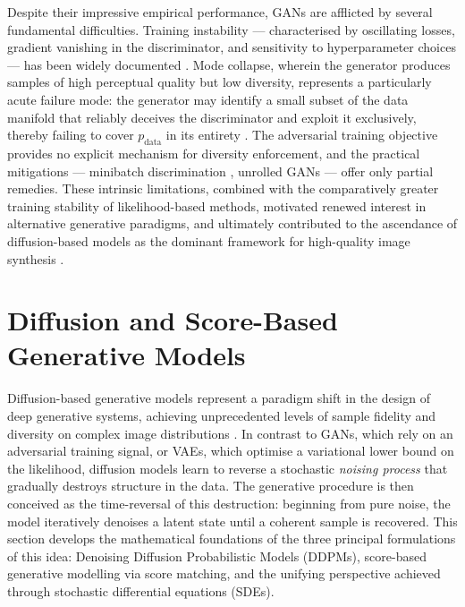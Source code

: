 Despite their impressive empirical performance, GANs are afflicted by several
fundamental difficulties. Training instability — characterised by oscillating
losses, gradient vanishing in the discriminator, and sensitivity to
hyperparameter choices — has been widely documented \cite{salimans2016improved}.
Mode collapse, wherein the generator produces samples of high perceptual
quality but low diversity, represents a particularly acute failure mode:
the generator may identify a small subset of the data manifold that reliably
deceives the discriminator and exploit it exclusively, thereby failing to
cover $p_{\text{data}}$ in its entirety . The
adversarial training objective provides no explicit mechanism for diversity
enforcement, and the practical mitigations — minibatch discrimination
\cite{salimans2016improved}, unrolled GANs — offer
only partial remedies. These intrinsic limitations, combined with the
comparatively greater training stability of likelihood-based methods, motivated
renewed interest in alternative generative paradigms, and ultimately contributed
to the ascendance of diffusion-based models as the dominant framework for
high-quality image synthesis \cite{dhariwal2021diffusion}.









































\section{Diffusion and Score-Based Generative Models}
\label{sec:diffusion}

Diffusion-based generative models represent a paradigm shift in the design of
deep generative systems, achieving unprecedented levels of sample fidelity and
diversity on complex image distributions \cite{dhariwal2021diffusion}. In
contrast to GANs, which rely on an adversarial training signal, or VAEs, which
optimise a variational lower bound on the likelihood, diffusion models learn to
reverse a stochastic \emph{noising process} that gradually destroys structure
in the data. The generative procedure is then conceived as the time-reversal
of this destruction: beginning from pure noise, the model iteratively denoises
a latent state until a coherent sample is recovered. This section develops the
mathematical foundations of the three principal formulations of this idea:
Denoising Diffusion Probabilistic Models (DDPMs), score-based generative
modelling via score matching, and the unifying perspective achieved through
stochastic differential equations (SDEs).

